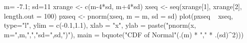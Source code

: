 \begin{Schunk}
\begin{Sinput}
     m= -7.1; sd=11
     xrange <- c(m-4*sd, m+4*sd)
     xseq <- seq(xrange[1], xrange[2], length.out = 100)
     pxseq <- pnorm(xseq, m = m, sd = sd)
     plot(pxseq ~ xseq, type="l", ylim = c(-0.1,1.1), xlab = "x", ylab = paste("pnorm(x, m=",m,",","sd=",sd,")"), main = bquote("CDF of Normal"(.(m) * "," * .(sd)^2)))
\end{Sinput}
\end{Schunk}
